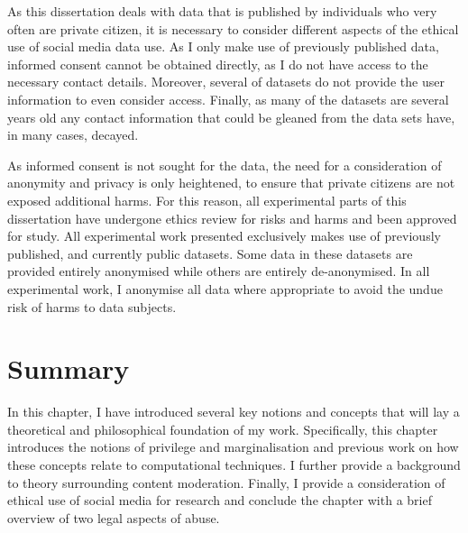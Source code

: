 As this dissertation deals with data that is published by individuals who very often are private citizen, it is necessary to consider different aspects of the ethical use of social media data use.
As I only make use of previously published data, informed consent cannot be obtained directly, as I do not have access to the necessary contact details.
Moreover, several of datasets do not provide the user information to even consider access.
Finally, as many of the datasets are several years old any contact information that could be gleaned from the data sets have, in many cases, decayed.

As informed consent is not sought for the data, the need for a consideration of anonymity and privacy is only heightened, to ensure that private citizens are not exposed additional harms.
For this reason, all experimental parts of this dissertation have undergone ethics review for risks and harms and been approved for study.
All experimental work presented exclusively makes use of previously published, and currently public datasets.
Some data in these datasets are provided entirely anonymised while others are entirely de-anonymised.
In all experimental work, I anonymise all data where appropriate to avoid the undue risk of harms to data subjects.

\section{Summary}
In this chapter, I have introduced several key notions and concepts that will lay a theoretical and philosophical foundation of my work.
Specifically, this chapter introduces the notions of privilege and marginalisation and previous work on how these concepts relate to computational techniques. I further provide a background to theory surrounding content moderation. Finally, I provide a consideration of ethical use of social media for research and conclude the chapter with a brief overview of two legal aspects of abuse.
